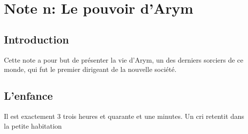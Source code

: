 \section{Note n: Le pouvoir d'Arym}
\subsection{Introduction}
Cette note a pour but de présenter la vie d'Arym, un des derniers sorciers de ce monde, qui fut le premier dirigeant de la nouvelle société.
\subsection{L'enfance}
Il est exactement 3 trois heures et quarante et une minutes. Un cri retentit dans la petite habitation 